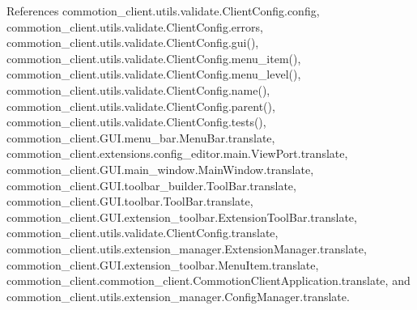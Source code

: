 References commotion\-\_\-client.\-utils.\-validate.\-Client\-Config.\-config, commotion\-\_\-client.\-utils.\-validate.\-Client\-Config.\-errors, commotion\-\_\-client.\-utils.\-validate.\-Client\-Config.\-gui(), commotion\-\_\-client.\-utils.\-validate.\-Client\-Config.\-menu\-\_\-item(), commotion\-\_\-client.\-utils.\-validate.\-Client\-Config.\-menu\-\_\-level(), commotion\-\_\-client.\-utils.\-validate.\-Client\-Config.\-name(), commotion\-\_\-client.\-utils.\-validate.\-Client\-Config.\-parent(), commotion\-\_\-client.\-utils.\-validate.\-Client\-Config.\-tests(), commotion\-\_\-client.\-G\-U\-I.\-menu\-\_\-bar.\-Menu\-Bar.\-translate, commotion\-\_\-client.\-extensions.\-config\-\_\-editor.\-main.\-View\-Port.\-translate, commotion\-\_\-client.\-G\-U\-I.\-main\-\_\-window.\-Main\-Window.\-translate, commotion\-\_\-client.\-G\-U\-I.\-toolbar\-\_\-builder.\-Tool\-Bar.\-translate, commotion\-\_\-client.\-G\-U\-I.\-toolbar.\-Tool\-Bar.\-translate, commotion\-\_\-client.\-G\-U\-I.\-extension\-\_\-toolbar.\-Extension\-Tool\-Bar.\-translate, commotion\-\_\-client.\-utils.\-validate.\-Client\-Config.\-translate, commotion\-\_\-client.\-utils.\-extension\-\_\-manager.\-Extension\-Manager.\-translate, commotion\-\_\-client.\-G\-U\-I.\-extension\-\_\-toolbar.\-Menu\-Item.\-translate, commotion\-\_\-client.\-commotion\-\_\-client.\-Commotion\-Client\-Application.\-translate, and commotion\-\_\-client.\-utils.\-extension\-\_\-manager.\-Config\-Manager.\-translate.


